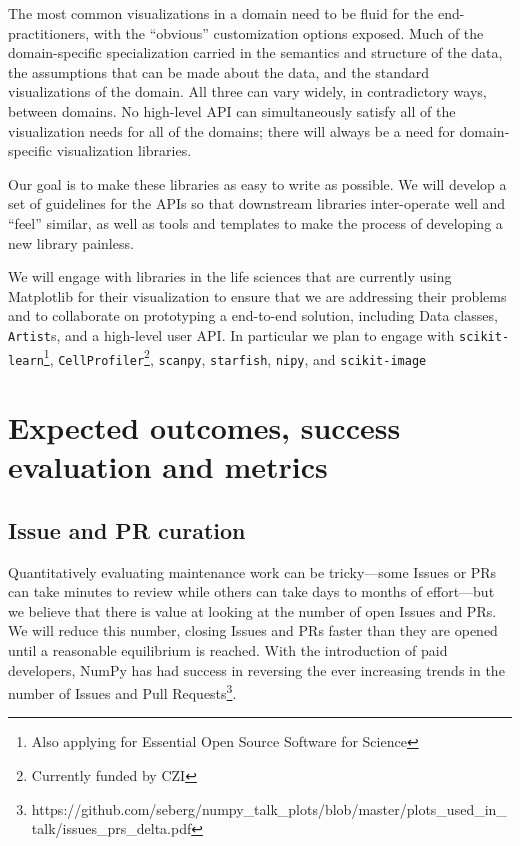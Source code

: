 \documentclass[11pt,letterpaper]{article}  %
\begin{document}
The most common visualizations in a domain need to be fluid for the
end-practitioners, with the ``obvious'' customization options exposed.
Much of the domain-specific specialization carried in the semantics
and structure of the data, the assumptions that can be made about the
data, and the standard visualizations of the domain.  All three can
vary widely, in contradictory ways, between domains.  No high-level
API can simultaneously satisfy all of the visualization needs for all
of the domains; there will always be a need for domain-specific
visualization libraries.


Our goal is to make these libraries as easy to write as possible.
We will develop a set of guidelines for the APIs so that downstream
libraries inter-operate well and ``feel'' similar, as well as tools
and templates to make the process of developing a new library
painless.

We will engage with libraries in the life sciences that are currently
using Matplotlib for their visualization to ensure that we are
addressing their problems and to collaborate on prototyping a
end-to-end solution, including Data classes, \texttt{Artist}s, and a
high-level user API.  In particular we plan to engage with
\texttt{scikit-learn}\footnote{Also applying for Essential Open Source
Software for Science}, \texttt{CellProfiler}\footnote{Currently funded
by CZI\label{f:czi}}, \texttt{scanpy},
\texttt{starfish}, \texttt{nipy}, and
\texttt{scikit-image}




\section{Expected outcomes, success evaluation and metrics}
\subsection{Issue and PR curation}

Quantitatively evaluating maintenance work can be tricky---some Issues
or PRs can take minutes to review while  others can take days to
months of effort---but we believe that there is value at looking at
the number of open Issues and PRs.  We will reduce this
number, closing Issues and PRs faster than they are
opened until a reasonable equilibrium is reached.
With the introduction of paid developers,
NumPy has had success in reversing the ever increasing trends
in the number of Issues and Pull Requests\footnote{https://github.com/seberg/numpy\_talk\_plots/blob/master/plots\_used\_in\_talk/issues\_prs\_delta.pdf}.
\end{document}
